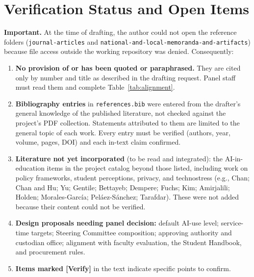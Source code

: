 \section{Verification Status and Open Items}\label{app:verification}

\textbf{Important.} At the time of drafting, the author could not open the reference folders (\texttt{journal-articles} and \texttt{national-and-local-memoranda-and-artifacts}) because file access outside the working repository was denied. Consequently:

\begin{enumerate}
  \item \textbf{No provision of \cmo{} or \rmo{} has been quoted or paraphrased.} They are cited only by number and title as described in the drafting request. Panel staff must read them and complete Table~\ref{tab:alignment}.
  \item \textbf{Bibliography entries} in \texttt{references.bib} were entered from the drafter's general knowledge of the published literature, not checked against the project's PDF collection. Statements attributed to them are limited to the general topic of each work. Every entry must be verified (authors, year, volume, pages, DOI) and each in-text claim confirmed.
  \item \textbf{Literature not yet incorporated} (to be read and integrated): the AI-in-education items in the project catalog beyond those listed, including work on policy frameworks, student perceptions, privacy, and technostress (e.g., Chan; Chan and Hu; Yu; Gentile; Bettayeb; Dempere; Fuchs; Kim; Amirjalili; Holden; Morales-Garc\'ia; Pel\'aez-S\'anchez; Tarafdar). These were not added because their content could not be verified.
  \item \textbf{Design proposals needing panel decision:} default AI-use level; service-time targets; Steering Committee composition; approving authority and custodian office; alignment with faculty evaluation, the Student Handbook, and procurement rules.
  \item \textbf{Items marked \textcolor{red!70!black}{[Verify]}} in the text indicate specific points to confirm.
\end{enumerate}
